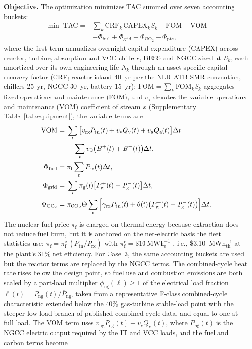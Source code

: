 \documentclass[sn-vancouver,Numbered]{sn-jnl}%
\newcommand{\runinhead}[1]{\par\smallskip\noindent\textbf{#1.}\quad}
\begin{document}
\runinhead{Objective}
The optimization minimizes TAC summed over seven accounting buckets:
\begin{equation}
\label{eq:tac}
\begin{aligned}
\min\; \mathrm{TAC} ={}&
\sum_k \mathrm{CRF}_k\,\mathrm{CAPEX}_k S_k + \mathrm{FOM} + \mathrm{VOM}\\
& + \Phi_{\mathrm{fuel}} + \Phi_{\mathrm{grid}} + \Phi_{\mathrm{CO}_2} - \Phi_{\mathrm{ptc}},
\end{aligned}
\end{equation}
where the first term annualizes overnight capital expenditure (CAPEX) across reactor, turbine, absorption and VCC chillers, BESS and NGCC sized at $S_k$, each amortized over its own engineering life $N_k$ through an asset-specific capital recovery factor (CRF; reactor island 40~yr per the NLR ATB SMR convention, chillers 25~yr, NGCC 30~yr, battery 15~yr); $\mathrm{FOM}=\sum_k \mathrm{FOM}_k S_k$ aggregates fixed operations and maintenance (FOM), and $v_{\mathrm{x}}$ denotes the variable operations and maintenance (VOM) coefficient of stream $x$ (Supplementary Table~\ref{tab:equipment}); the variable terms are
\begin{align}
\mathrm{VOM} ={}&
  \sum_t \big[v_{\mathrm{rx}} P_{\mathrm{tn}}(t) + v_{\mathrm{v}} Q_{\mathrm{v}}(t) + v_{\mathrm{a}} Q_{\mathrm{a}}(t)\big]\Delta t
  \notag\\
& + \sum_t v_{\mathrm{B}}\big(B^{+}(t)+B^{-}(t)\big)\Delta t, \label{eq:vom}\\
\Phi_{\mathrm{fuel}} ={}& \pi_{\mathrm{f}} \sum_t P_{\mathrm{rx}}(t)\Delta t, \label{eq:fuel_cost}\\
\Phi_{\mathrm{grid}} ={}&
  \sum_t \pi_{\mathrm{g}}(t)\big[P_{\mathrm{g}}^{+}(t) - P_{\mathrm{g}}^{-}(t)\big]\Delta t, \label{eq:grid_cost}\\
\Phi_{\mathrm{CO}_2} ={}&
  \pi_{\mathrm{CO}_2}\Theta \sum_t
  \Big[\gamma_{\mathrm{rx}} P_{\mathrm{tn}}(t) + \theta(t)\big(P_{\mathrm{g}}^{+}(t)-P_{\mathrm{g}}^{-}(t)\big)\Big]\Delta t. \label{eq:carbon_cost}
\end{align}
The nuclear fuel price $\pi_{\mathrm{f}}$ is charged on thermal energy because extraction does not reduce fuel burn, but it is anchored on the net-electric basis the fleet statistics use: $\pi_{\mathrm{f}} = \pi_{\mathrm{f}}^{\mathrm{e}}\,(\overline{P}_{\mathrm{tn}}/\overline{P}_{\mathrm{rx}})$ with $\pi_{\mathrm{f}}^{\mathrm{e}} = \$10~\mathrm{MWh}_\mathrm{e}^{-1}$ \citep{li2026nuclearH2}, i.e., \$3.10~MWh$_\mathrm{th}^{-1}$ at the plant's 31\% net efficiency. For Case~3, the same accounting buckets are used but the reactor terms are replaced by the NGCC terms. The combined-cycle heat rate rises below the design point, so fuel use and combustion emissions are both scaled by a part-load multiplier $\phi_{\mathrm{ng}}(\ell)\ge 1$ of the electrical load fraction $\ell(t)=P_{\mathrm{ng}}(t)/\overline{P}_{\mathrm{ng}}$, taken from a representative F-class combined-cycle characteristic extended below the 40\% gas-turbine stable-load point with the steeper low-load branch of published combined-cycle data, and equal to one at full load. The VOM term uses $v_{\mathrm{ng}}P_{\mathrm{ng}}(t)+v_{\mathrm{v}}Q_{\mathrm{v}}(t)$, where $P_{\mathrm{ng}}(t)$ is the NGCC electric output required by the IT and VCC loads, and the fuel and carbon terms become
\end{document}

